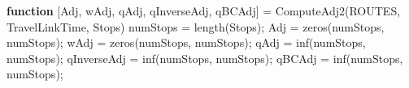 \documentclass[
  letterpaper,
  DIV=11,
  numbers=noendperiod]{scrartcl}
\newenvironment{Shaded}{\begin{snugshade}}{\end{snugshade}}
\newcommand{\KeywordTok}[1]{\textcolor[rgb]{0.00,0.23,0.31}{\textbf{#1}}}
\newcommand{\NormalTok}[1]{\textcolor[rgb]{0.00,0.23,0.31}{#1}}
\newcommand{\OperatorTok}[1]{\textcolor[rgb]{0.37,0.37,0.37}{#1}}
\newcommand{\VariableTok}[1]{\textcolor[rgb]{0.07,0.07,0.07}{#1}}
\begin{document}
\begin{Shaded}
\begin{Highlighting}[]
\KeywordTok{function}\NormalTok{ [}\VariableTok{Adj}\OperatorTok{,} \VariableTok{wAdj}\OperatorTok{,} \VariableTok{qAdj}\OperatorTok{,} \VariableTok{qInverseAdj}\OperatorTok{,} \VariableTok{qBCAdj}\NormalTok{] }\OperatorTok{=} \VariableTok{ComputeAdj2}\NormalTok{(}\VariableTok{ROUTES}\OperatorTok{,} \VariableTok{TravelLinkTime}\OperatorTok{,} \VariableTok{Stops}\NormalTok{)}
    \VariableTok{numStops} \OperatorTok{=} \VariableTok{length}\NormalTok{(}\VariableTok{Stops}\NormalTok{)}\OperatorTok{;}
    \VariableTok{Adj} \OperatorTok{=} \VariableTok{zeros}\NormalTok{(}\VariableTok{numStops}\OperatorTok{,} \VariableTok{numStops}\NormalTok{)}\OperatorTok{;}
    \VariableTok{wAdj} \OperatorTok{=} \VariableTok{zeros}\NormalTok{(}\VariableTok{numStops}\OperatorTok{,} \VariableTok{numStops}\NormalTok{)}\OperatorTok{;}
    \VariableTok{qAdj} \OperatorTok{=} \VariableTok{inf}\NormalTok{(}\VariableTok{numStops}\OperatorTok{,} \VariableTok{numStops}\NormalTok{)}\OperatorTok{;}
    \VariableTok{qInverseAdj} \OperatorTok{=} \VariableTok{inf}\NormalTok{(}\VariableTok{numStops}\OperatorTok{,} \VariableTok{numStops}\NormalTok{)}\OperatorTok{;}
    \VariableTok{qBCAdj} \OperatorTok{=} \VariableTok{inf}\NormalTok{(}\VariableTok{numStops}\OperatorTok{,} \VariableTok{numStops}\NormalTok{)}\OperatorTok{;}


\end{Highlighting}
\end{Shaded}
\end{document}
